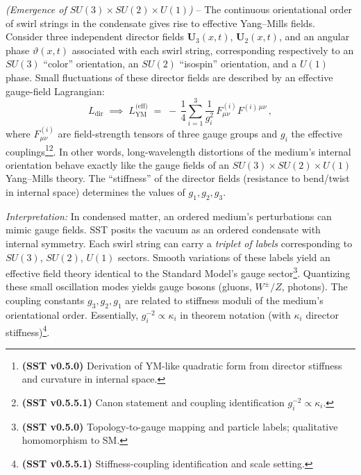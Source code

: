 \documentclass[reprint,aps,onecolumn,nofootinbib]{revtex4-2}
\begin{document}
    \begin{tcolorbox}[title=Theorem 6.1: Emergent Yang–Mills Fields]
    \emph{(Emergence of $SU(3)\times SU(2)\times U(1)$)} – The continuous orientational order of swirl strings in the condensate gives rise to effective Yang–Mills fields. Consider three independent director fields $\mathbf{U}_3(x,t)$, $\mathbf{U}_2(x,t)$, and an angular phase $\vartheta(x,t)$ associated with each swirl string, corresponding respectively to an $SU(3)$ “color” orientation, an $SU(2)$ “isospin” orientation, and a $U(1)$ phase. Small fluctuations of these director fields are described by an effective gauge-field Lagrangian:
    \[
        L_{\text{dir}} \;\implies\; L_{\text{YM}}^{\text{(eff)}} \;=\; -\,\frac{1}{4}\sum_{i=1}^3 \frac{1}{g_i^2}\,F^{(i)}_{\mu\nu} F^{(i)\,\mu\nu}\,,
    \]
    where $F_{\mu\nu}^{(i)}$ are field-strength tensors of three gauge groups and $g_i$ the effective couplings\footnote{\textbf{(SST v0.5.0)} Derivation of YM-like quadratic form from director stiffness and curvature in internal space.}\footnote{\textbf{(SST v0.5.5.1)} Canon statement and coupling identification $g_i^{-2}\propto \kappa_i$.}. In other words, long-wavelength distortions of the medium’s internal orientation behave exactly like the gauge fields of an $SU(3)\times SU(2)\times U(1)$ Yang–Mills theory. The “stiffness” of the director fields (resistance to bend/twist in internal space) determines the values of $g_1, g_2, g_3$.
    \end{tcolorbox}

    \noindent \textit{Interpretation:} In condensed matter, an ordered medium’s perturbations can mimic gauge fields. SST posits the vacuum as an ordered condensate with internal symmetry. Each swirl string can carry a \emph{triplet of labels} corresponding to $SU(3)$, $SU(2)$, $U(1)$ sectors. Smooth variations of these labels yield an effective field theory identical to the Standard Model’s gauge sector\footnote{\textbf{(SST v0.5.0)} Topology-to-gauge mapping and particle labels; qualitative homomorphism to SM.}. Quantizing these small oscillation modes yields gauge bosons (gluons, $W^\pm/Z$, photons). The coupling constants $g_{3}, g_{2}, g_{1}$ are related to stiffness moduli of the medium’s orientational order. Essentially, $g_i^{-2} \propto \kappa_i$ in theorem notation (with $\kappa_i$ director stiffness)\footnote{\textbf{(SST v0.5.5.1)} Stiffness-coupling identification and scale setting.}.
\end{document}
